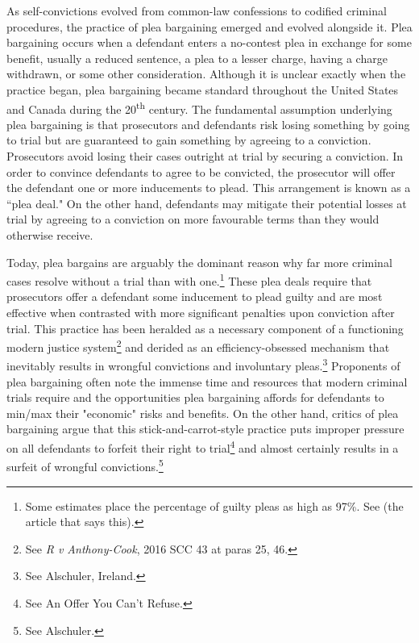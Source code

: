 As self-convictions evolved from common-law confessions to codified criminal procedures, the practice of plea bargaining emerged and evolved alongside it. Plea bargaining occurs when a defendant enters a no-contest plea in exchange for some benefit, usually a reduced sentence, a plea to a lesser charge, having a charge withdrawn, or some other consideration. Although it is unclear exactly when the practice began, plea bargaining became standard throughout the United States and Canada during the 20\textsuperscript{th} century. The fundamental assumption underlying plea bargaining is that prosecutors and defendants risk losing something by going to trial but are guaranteed to gain something by agreeing to a conviction. Prosecutors avoid losing their cases outright at trial by securing a conviction. In order to convince defendants to agree to be convicted, the prosecutor will offer the defendant one or more inducements to plead. This arrangement is known as a ``plea deal."  On the other hand, defendants may mitigate their potential losses at trial by agreeing to a conviction on more favourable terms than they would otherwise receive. 

Today, plea bargains are arguably the dominant reason why far more criminal cases resolve without a trial than with one.\footnote{Some estimates place the percentage of guilty pleas as high as 97\%. See (the article that says this).} These plea deals require that prosecutors offer a defendant some inducement to plead guilty and are most effective when contrasted with more significant penalties upon conviction after trial. This practice has been heralded as a necessary component of a functioning modern justice system\footnote{See \textit{R v Anthony-Cook}, 2016 SCC 43 at paras 25, 46.} and derided as an efficiency-obsessed mechanism that inevitably results in wrongful convictions and involuntary pleas.\footnote{See Alschuler, Ireland.} Proponents of plea bargaining often note the immense time and resources that modern criminal trials require and the opportunities plea bargaining affords for defendants to min/max their "economic" risks and benefits. On the other hand, critics of plea bargaining argue that this stick-and-carrot-style practice puts improper pressure on all defendants to forfeit their right to trial\footnote{See An Offer You Can't Refuse.} and almost certainly results in a surfeit of wrongful convictions.\footnote{See Alschuler.}

